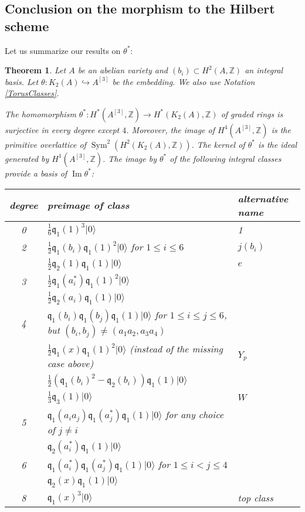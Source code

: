 \documentclass{alggeom}
\DeclareMathOperator{\im}{Im}
\DeclareMathOperator{\Sym}{Sym}
\newcommand{\hilb}[1]{^{[#1]}}
\newcommand{\vac}{|0\rangle}
\newcommand{\q}{\mathfrak{q}}
\newcommand{\kum}[2]{K_{ #2 }( #1 )}
\newcommand{\Z}{\mathbb{Z}}
\theoremstyle{plain}
\newtheorem{theorem}{Theorem}[section]
\theoremstyle{definition}
\theoremstyle{remark}
\begin{document}
\subsection{Conclusion on the morphism to the Hilbert scheme}
Let us summarize our results on $\theta^*$:
\begin{theorem}\label{thetaTheorem}
Let $A$ be an abelian variety and $(b_i)\subset H^2(A,\Z)$ an integral basis. Let $\theta: \kum{A}{2}\hookrightarrow A^{[3]}$ be the embedding. We also use Notation \ref{TorusClasses}.

The homomorphism $\theta^*:H^*(A\hilb{3},\Z)\rightarrow H^*(\kum{A}{2},\Z)$ of graded rings is surjective in every degree except $4$. Moreover, the image of $H^4(A\hilb{3},\Z)$ is the primitive overlattice of $\Sym^2(H^2(\kum{A}{2},\Z))$. 
The kernel of $\theta^*$ is the ideal generated by $H^1(A\hilb{3},\Z)$.
The image by $\theta^*$ of the following integral classes provide a basis of $\im\theta^*$:
\begin{center}
\begin{tabular}{c|l|l}
degree & preimage of class & alternative name  \\
\hline
0 & $\frac{1}{6} \q_1(1)^3\vac$ & 1 \\
\hline
2 &  $\frac{1}{2}\q_1(b_i) \q_1(1)^2\vac$ for $1\leq i\leq 6$ & $j(b_i)$ \\
 & $\frac{1}{2} \q_2(1)\q_1(1)\vac $  & $e$\\
\hline
3 & $\frac{1}{2}\q_1(a^*_i)\q_1(1)^2\vac$ & \\
  & $\frac{1}{2}\q_2(a_i)\q_1(1)\vac$ & \\
\hline
4 & $\q_1(b_i)\q_1(b_j)\q_1(1)\vac$ for $1\leq i\leq j\leq 6$, but $(b_i,b_j)\neq(a_1a_2,a_3a_4)$ &\\
  & $\frac{1}{2}\q_1(x)\q_1(1)^2\vac$ (instead of the missing case above)  & $Y_p$\\
  & $\frac{1}{2}\left(\q_1(b_i)^2-\q_2(b_i)\right)\q_1(1)\vac$ & \\
  & $\frac{1}{3} \q_3(1)\vac$ & $W$ \\
\hline
5 & $\q_1(a_ia_j)\q_1(a_j^*)\q_1(1) \vac$ for any choice of $j\neq i$ &\\
  & $\q_2(a^*_i)\q_1(1)\vac $ &\\
\hline
6 & $\q_1(a_i^*)\q_1(a_j^*)\q_1(1)\vac$ for $1\leq i< j\leq 4$ & \\
  & $\q_2(x)\q_1(1)\vac$ & \\
\hline
8 & $\q_1(x)^3\vac$ & top class
\end{tabular}
\end{center}
\end{theorem}
\end{document}
